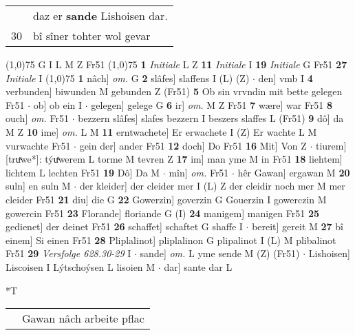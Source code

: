 \documentclass[8pt,a4paper,notitlepage]{article}
\begin{document}
\begin{table}[ht]
\begin{minipage}[t]{0.5\linewidth}
\begin{tabular}{rl}
 & daz er \textbf{sande} Lishoisen dar.\\ 
30 & bî sîner tohter wol gevar\\ 
\end{tabular}
\scriptsize
\line(1,0){75} \newline
G I L M Z Fr51 \newline
\line(1,0){75} \newline
\textbf{1} \textit{Initiale} L Z  \textbf{11} \textit{Initiale} I  \textbf{19} \textit{Initiale} G Fr51  \textbf{27} \textit{Initiale} I  \newline
\line(1,0){75} \newline
\textbf{1} nâch] \textit{om.} G \textbf{2} slâfes] slaffens I (L) (Z)  $\cdot$ den] vmb I \textbf{4} verbunden] biwunden M gebunden Z (Fr51) \textbf{5} Ob sin vrvndin mit bette gelegen Fr51  $\cdot$ ob] ob ein I  $\cdot$ gelegen] gelege G \textbf{6} ir] \textit{om.} M Z Fr51 \textbf{7} wære] war Fr51 \textbf{8} ouch] \textit{om.} Fr51  $\cdot$ bezzern slâfes] slafes bezzern I beszers slaffes L (Fr51) \textbf{9} dô] da M Z \textbf{10} ime] \textit{om.} L M \textbf{11} erntwachete] Er erwachete I (Z) Er wachte L M vurwachte Fr51  $\cdot$ gein der] ander Fr51 \textbf{12} doch] Do Fr51 \textbf{16} Mit] Von Z  $\cdot$ tiurem] [truͯwe*]: týuͯwerem L torme M tevren Z \textbf{17} im] man yme M in Fr51 \textbf{18} liehtem] lichtem L lechten Fr51 \textbf{19} Dô] Da M  $\cdot$ mîn] \textit{om.} Fr51  $\cdot$ hêr Gawan] ergawan M \textbf{20} suln] en suln M  $\cdot$ der kleider] der cleider mer I (L) Z der cleidir noch mer M mer cleider Fr51 \textbf{21} diu] die G \textbf{22} Gowerzin] goverzin G Gouerzin I gowerczin M gowercin Fr51 \textbf{23} Florande] floriande G (I) \textbf{24} manigem] manigen Fr51 \textbf{25} gedienet] der deinet Fr51 \textbf{26} schaffet] schaftet G shaffe I  $\cdot$ bereit] gereit M \textbf{27} bî einem] Si einen Fr51 \textbf{28} Pliplalinot] pliplalinon G plipalinot I (L) M plibalinot Fr51 \textbf{29} \textit{Versfolge 628.30-29} I   $\cdot$ sande] \textit{om.} L yme sende M (Z) (Fr51)  $\cdot$ Lishoisen] Liscoisen I Lýtschoýsen L lisoien M  $\cdot$ dar] sante dar L \newline
\end{minipage}
\hspace{0.5cm}
\begin{minipage}[t]{0.5\linewidth}
\small
\begin{center}*T
\end{center}
\begin{tabular}{rl}
 & Gawan nâch arbeite pflac\\ 

\end{tabular}
\end{minipage}
\end{table}
\end{document}

